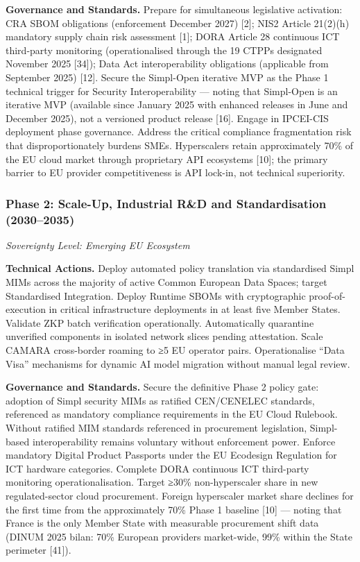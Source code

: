 \documentclass{ieeeaccess}
\begin{document}
\textbf{Governance and Standards.} Prepare for simultaneous legislative
activation: CRA SBOM obligations (enforcement December 2027) {[}2{]};
NIS2 Article 21(2)(h) mandatory supply chain risk assessment {[}1{]};
DORA Article 28 continuous ICT third-party monitoring (operationalised
through the 19 CTPPs designated November 2025 {[}34{]}); Data Act
interoperability obligations (applicable from September 2025) {[}12{]}.
Secure the Simpl-Open iterative MVP as the Phase 1 technical trigger for
Security Interoperability --- noting that Simpl-Open is an iterative MVP
(available since January 2025 with enhanced releases in June and
December 2025), not a versioned product release {[}16{]}. Engage in
IPCEI-CIS deployment phase governance. Address the critical compliance
fragmentation risk that disproportionately burdens SMEs. Hyperscalers
retain approximately 70\% of the EU cloud market through proprietary API
ecosystems {[}10{]}; the primary barrier to EU provider competitiveness
is API lock-in, not technical superiority.

\subsubsection{Phase 2: Scale-Up, Industrial R\&D and Standardisation
(2030--2035)}\label{phase-2-scale-up-industrial-rd-and-standardisation-20302035-2}

\emph{Sovereignty Level: Emerging EU Ecosystem}

\textbf{Technical Actions.} Deploy automated policy translation via
standardised Simpl MIMs across the majority of active Common European
Data Spaces; target Standardised Integration. Deploy Runtime SBOMs with
cryptographic proof-of-execution in critical infrastructure deployments
in at least five Member States. Validate ZKP batch verification
operationally. Automatically quarantine unverified components in
isolated network slices pending attestation. Scale CAMARA cross-border
roaming to ≥5 EU operator pairs. Operationalise ``Data Visa'' mechanisms
for dynamic AI model migration without manual legal review.

\textbf{Governance and Standards.} Secure the definitive Phase 2 policy
gate: adoption of Simpl security MIMs as ratified CEN/CENELEC standards,
referenced as mandatory compliance requirements in the EU Cloud
Rulebook. Without ratified MIM standards referenced in procurement
legislation, Simpl-based interoperability remains voluntary without
enforcement power. Enforce mandatory Digital Product Passports under the
EU Ecodesign Regulation for ICT hardware categories. Complete DORA
continuous ICT third-party monitoring operationalisation. Target ≥30\%
non-hyperscaler share in new regulated-sector cloud procurement. Foreign
hyperscaler market share declines for the first time from the
approximately 70\% Phase 1 baseline {[}10{]} --- noting that France is
the only Member State with measurable procurement shift data (DINUM 2025
bilan: 70\% European providers market-wide, 99\% within the State
perimeter {[}41{]}).
\end{document}
